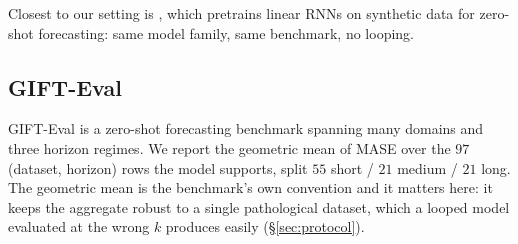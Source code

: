 Closest to our setting is \citet{moroshan2026tempopfn}, which pretrains linear
RNNs on synthetic data for zero-shot forecasting: same model family, same
benchmark, no looping.

\subsection{GIFT-Eval}

GIFT-Eval \citep{aksu2024giftevalbenchmark} is a zero-shot forecasting
benchmark spanning many domains and three horizon regimes. We report the
geometric mean of MASE over the $97$ (dataset, horizon) rows the model
supports, split $55$ short / $21$ medium / $21$ long. The geometric mean is the
benchmark's own convention and it matters here: it keeps the aggregate robust
to a single pathological dataset, which a looped model evaluated at the wrong
$k$ produces easily (\S\ref{sec:protocol}).
